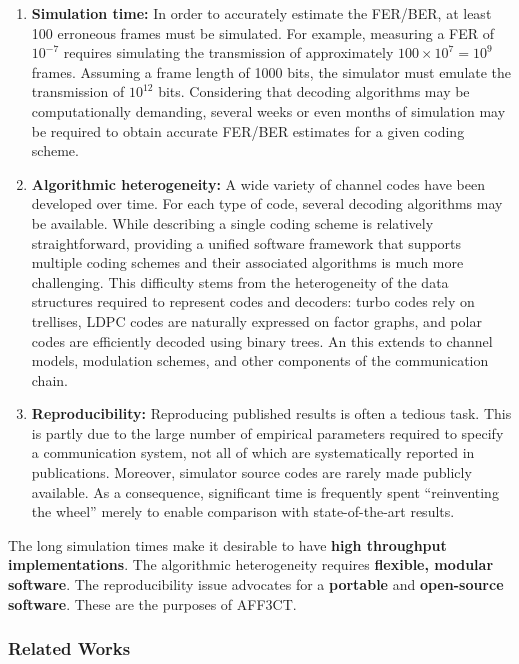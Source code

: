 \documentclass[11pt]{report}
\newcommand{\AFFECT}{AFF3CT\xspace}
\begin{document}
\begin{enumerate}
  \item \textbf{Simulation time:} In order to accurately estimate the FER/BER, at least 100 erroneous frames must be simulated. For example, measuring a FER of $10^{-7}$ requires simulating the transmission of approximately $100 \times 10^{7} = 10^{9}$ frames. Assuming a frame length of 1000 bits, the simulator must emulate the transmission of $10^{12}$ bits. Considering that decoding algorithms may be computationally demanding, several weeks or even months of simulation may be required to obtain accurate FER/BER estimates for a given coding scheme.

  \item \textbf{Algorithmic heterogeneity:} A wide variety of channel codes have been developed over time. For each type of code, several decoding algorithms may be available. While describing a single coding scheme is relatively straightforward, providing a unified software framework that supports multiple coding schemes and their associated algorithms is much more challenging. This difficulty stems from the heterogeneity of the data structures required to represent codes and decoders: turbo codes rely on trellises, LDPC codes are naturally expressed on factor graphs, and polar codes are efficiently decoded using binary trees. An this extends to channel models, modulation schemes, and other components of the communication chain.

  \item \textbf{Reproducibility:} Reproducing published results is often a tedious task. This is partly due to the large number of empirical parameters required to specify a communication system, not all of which are systematically reported in publications. Moreover, simulator source codes are rarely made publicly available. As a consequence, significant time is frequently spent ``reinventing the wheel'' merely to enable comparison with state-of-the-art results.
\end{enumerate}

The long simulation times make it desirable to have \textbf{high throughput
  implementations}. The algorithmic heterogeneity requires \textbf{flexible,
  modular software}. The reproducibility issue advocates for a \textbf{portable}
and \textbf{open-source software}. These are the purposes of \AFFECT.

\subsubsection{Related Works}
\end{document}
